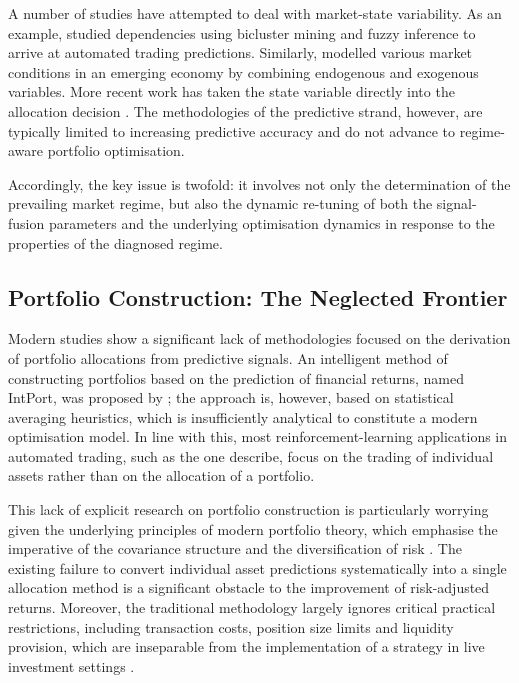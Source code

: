 A number of studies have attempted to deal with market-state variability. As an example,
\citet{huang20} studied dependencies using bicluster mining and fuzzy inference to arrive
at automated trading predictions. Similarly, \citet{alsheebah24} modelled various market
conditions in an emerging economy by combining endogenous and exogenous variables. More
recent work has taken the state variable directly into the allocation decision
\citep{li25,luo26}. The methodologies of the predictive strand, however, are typically
limited to increasing predictive accuracy and do not advance to regime-aware portfolio
optimisation.

Accordingly, the key issue is twofold: it involves not only the determination of the
prevailing market regime, but also the dynamic re-tuning of both the signal-fusion
parameters and the underlying optimisation dynamics in response to the properties of the
diagnosed regime.

\subsection{Portfolio Construction: The Neglected Frontier}

Modern studies show a significant lack of methodologies focused on the derivation of
portfolio allocations from predictive signals. An intelligent method of constructing
portfolios based on the prediction of financial returns, named IntPort, was proposed by
\citet{sami25}; the approach is, however, based on statistical averaging heuristics,
which is insufficiently analytical to constitute a modern optimisation model. In line
with this, most reinforcement-learning applications in automated trading, such as the one
\citet{kabbani22} describe, focus on the trading of individual assets rather than on the
allocation of a portfolio.

This lack of explicit research on portfolio construction is particularly worrying given
the underlying principles of modern portfolio theory, which emphasise the imperative of
the covariance structure and the diversification of risk \citep{markowitz52}. The
existing failure to convert individual asset predictions systematically into a single
allocation method is a significant obstacle to the improvement of risk-adjusted returns.
Moreover, the traditional methodology largely ignores critical practical restrictions,
including transaction costs, position size limits and liquidity provision, which are
inseparable from the implementation of a strategy in live investment settings
\citep{demiguel09}.

